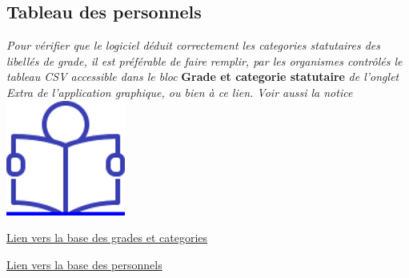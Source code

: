 \hypertarget{tableau-des-personnels}{%
\subsection{Tableau des personnels}\label{tableau-des-personnels}}

\emph{Pour vérifier que le logiciel déduit correctement les categories
statutaires des libellés de grade, il est préférable de faire remplir,
par les organismes contrôlés le tableau CSV accessible dans le bloc}
\textbf{Grade et categorie statutaire} \emph{de l'onglet Extra de
l'application graphique, ou bien à ce lien. Voir aussi la notice} ~
\href{../Docs/Notices/fiche_tableau_categories.odt}{\includegraphics{icones/Notice.png}}

\href{../Bases/Effectifs/grades.categories.csv}{Lien vers la base des
grades et categories}

\href{../Bases/Effectifs/matricules.csv}{Lien vers la base des personnels}
